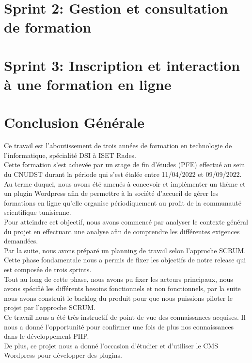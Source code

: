\documentclass[a4paper, oneside, 12pt, final]{extreport}
\begin{document}
\chapter{Sprint 2: Gestion et consultation de formation}%
\label{chap:4}

\chapter{Sprint 3: Inscription et interaction à une formation en ligne}%
\label{chap:5}

\chapter*{Conclusion Générale}
\label{chap:Conclusion Générale}
%
Ce travail est l'aboutissement de trois années de formation en technologie de l'informatique, spécialité DSI à ISET Rades.\\
Cette formation s'est achevée par un stage de fin d'études (PFE) effectué au sein du CNUDST durant la période qui s'est étalée entre 11/04/2022 et 09/09/2022. Au terme duquel, nous avons été amenés à concevoir et implémenter un thème et un plugin Wordpress afin de permettre à la société d'accueil de gérer les formations en ligne qu'elle organise périodiquement au profit de la communauté scientifique tunisienne.\\
Pour atteindre cet objectif, nous avons commencé par analyser le contexte général du projet en effectuant une analyse afin de comprendre les différentes exigences demandées.\\
Par la suite, nous avons préparé un planning de travail selon l'approche SCRUM.\\ Cette phase fondamentale nous a permis de fixer les objectifs de notre release qui est composée de trois sprints.\\
Tout au long de cette phase, nous avons pu fixer les acteurs principaux, nous avons spécifié les différents besoins fonctionnels et non fonctionnels, par la suite nous avons construit le backlog du produit pour que nous puissions piloter le projet par l'approche SCRUM.\\
Ce travail nous a été très instructif de point de vue des connaissances acquises. Il nous a donné l'opportunité pour confirmer une fois de plus nos connaissances dans le développement PHP.\\
De plus, ce projet nous a donné l'occasion d'étudier et d'utiliser le CMS Wordpress pour développer des plugins.\\
\end{document}
